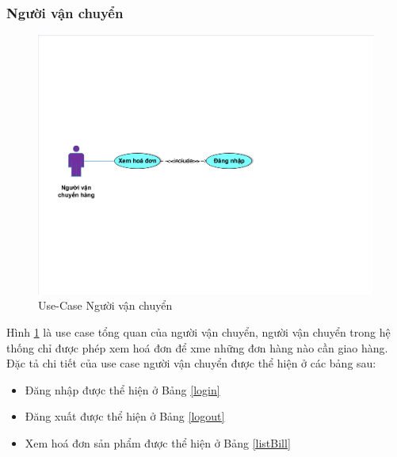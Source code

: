 \subsubsection{Người vận chuyển}
\begin{center}
    \begin{figure}[h]
    \begin{center}
     \includegraphics[scale=0.7]{image/UseCaseTongQuanNVC.pdf}
    \end{center}
    \caption{Use-Case Người vận chuyển}
    \label{refhinh3_5}
    \end{figure}
\end{center}
Hình \ref{refhinh3_5} là use case tổng quan của người vận chuyển, người vận chuyển trong hệ thống chỉ được phép xem hoá đơn để xme những đơn hàng nào cần giao hàng. Đặc tả chi tiết của use case người vận chuyển được thể hiện ở các bảng sau:
\begin{itemize}
\item Đăng nhập được thể hiện ở Bảng \ref{login}
\item Đăng xuất được thể hiện ở Bảng \ref{logout}
\item Xem hoá đơn sản phẩm được thể hiện ở Bảng \ref{listBill}
\end{itemize}
